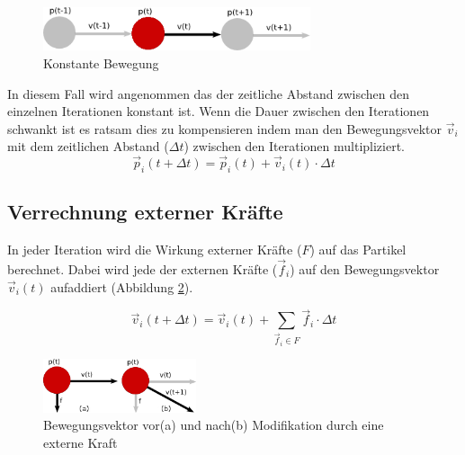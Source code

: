 \begin{Spacing}{\mylinespace}
        \begin{figure}[h!]
			\centering
			\vspace*{30px}
			\includegraphics[width=0.7\textwidth]{graphics/Phys_bew0.png}
			\caption{Konstante Bewegung}
			\label{fig:BewegungPartikel}
		\end{figure}

		In diesem Fall wird angenommen das der zeitliche Abstand zwischen den
		einzelnen Iterationen konstant ist. Wenn die Dauer zwischen den Iterationen
		schwankt ist es ratsam dies zu kompensieren indem man den Bewegungsvektor
		$\vec{v}_{i}$ mit dem zeitlichen Abstand ($\Delta t$) zwischen den
		Iterationen multipliziert.
		 \[ \vec{p}_{i}(t+\Delta t) = \vec{p}_{i}(t) + \vec{v}_{i}(t) \cdot \Delta t\]

    \subsection{Verrechnung externer Kräfte}
        In jeder Iteration wird die Wirkung externer Kräfte ($F$) auf das
        Partikel berechnet. Dabei wird jede der externen Kräfte ($\vec{f}_i$) auf den
        Bewegungsvektor $\vec{v}_{i}(t)$ aufaddiert (Abbildung \ref{fig:ModForce}).

        \[ \vec{v}_{i}(t+\Delta t) = \vec{v}_{i}(t) + \sum_{\vec{f}_{i} \in F}{\vec{f}_{i} \cdot \Delta t} \]

		\begin{figure}[h!]
			\centering
			\includegraphics[width=0.4\textwidth]{graphics/Phys_bew12.png}
			\caption{Bewegungsvektor vor(a) und nach(b) Modifikation durch eine externe Kraft }
			\label{fig:ModForce}
		\end{figure}


\end{Spacing}
